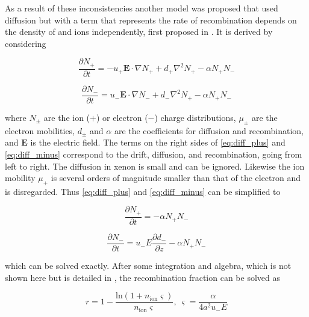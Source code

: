 As a result of these inconsistencies another model was proposed that used diffusion but with a term that represents the rate of
recombination depends on
the density of \electron and ions independently, first proposed in .  It is derived by considering

\begin{equation}
\frac{\partial N_{+}}{\partial t} = -u_{+} \mathbf{E} \cdot \nabla N_{+} + d_{+} \nabla^{2} N_{+} - \alpha N_{+} N_{-}
\label{eq:diff_plus}
\end{equation}

\begin{equation}
\frac{\partial N_{-}}{\partial t} = u_{-} \mathbf{E} \cdot \nabla N_{-} + d_{-} \nabla^{2} N_{+} - \alpha N_{+} N_{-}
\label{eq:diff_minus}
\end{equation}

\noindent where $N_{\pm}$ are the ion ($+$) or electron ($-$) charge distributions, $\mu_{\pm}$ are the electron mobilities, $d_{\pm}$
and $\alpha$
are the coefficients for diffusion and recombination, and $\mathbf{E}$ is the electric field.  The terms on the right sides of
\eqref{eq:diff_plus} and \eqref{eq:diff_minus} correspond to the drift, diffusion, and recombination, going from left to right.  The
diffusion in xenon is small and can be ignored.  Likewise the ion mobility $\mu_{+}$ is several orders of magnitude smaller than that
of the electron and is disregarded.  Thus \eqref{eq:diff_plus} and \eqref{eq:diff_minus} can be simplified to

\begin{equation}
\frac{\partial N_{+}}{\partial t} = - \alpha N_{+} N_{-}
\label{eq:diff_simple_plus}
\end{equation}

\begin{equation}
\frac{\partial N_{-}}{\partial t} = u_{-} E \frac{\partial d_{-}}{\partial z} - \alpha N_{+} N_{-}
\label{eq:diff_simple_minus}
\end{equation}

\noindent which can be solved exactly.  After some integration and algebra, which is not shown here but is detailed in
, the recombination fraction can be solved as

\begin{equation}
r = 1 - \frac{\mathrm{ln} (1 + n_{\mathrm{ion}} \varsigma)}{n_{\mathrm{ion}} \varsigma},\ \varsigma = \frac{\alpha}{4 a^{2} u_{-} E}
\label{eq:ti_recomb}
\end{equation}

